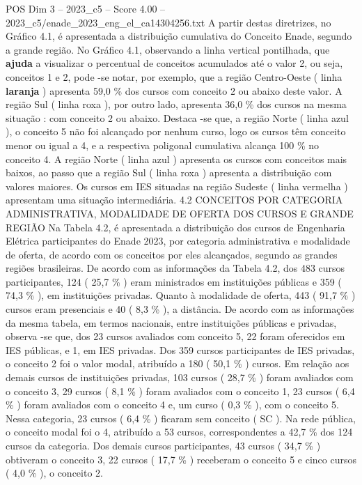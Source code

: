 \begin{textsample}{POS Dim 3 – 2023\_c5 – Score 4.00 – 2023\_c5/enade\_2023\_eng\_el\_ca14304256.txt}
A partir destas diretrizes, no Gráfico 4.1, é apresentada a distribuição cumulativa do Conceito Enade, segundo a grande região.
No Gráfico 4.1, observando a linha vertical pontilhada, que \textbf{ajuda} a visualizar o percentual de conceitos acumulados até o valor 2, ou seja, conceitos 1 e 2, pode -se notar, por exemplo, que a região Centro-Oeste ( linha \textbf{laranja} ) apresenta 59,0 \% dos cursos com conceito 2 ou abaixo deste valor.
A região Sul ( linha roxa ), por outro lado, apresenta 36,0 \% dos cursos na mesma situação : com conceito 2 ou abaixo.
Destaca -se que, a região Norte ( linha azul ), o conceito 5 não foi alcançado por nenhum curso, logo os cursos têm conceito menor ou igual a 4, e a respectiva poligonal cumulativa alcança 100 \% no conceito 4.
A região Norte ( linha azul ) apresenta os cursos com conceitos mais baixos, ao passo que a região Sul ( linha roxa ) apresenta a distribuição com valores maiores.
Os cursos em IES situadas na região Sudeste ( linha vermelha ) apresentam uma situação intermediária. 4.2 CONCEITOS POR CATEGORIA ADMINISTRATIVA, MODALIDADE DE OFERTA DOS CURSOS E GRANDE REGIÃO Na Tabela 4.2, é apresentada a distribuição dos cursos de Engenharia Elétrica participantes do Enade 2023, por categoria administrativa e modalidade de oferta, de acordo com os conceitos por eles alcançados, segundo as grandes regiões brasileiras.
De acordo com as informações da Tabela 4.2, dos 483 cursos participantes, 124 ( 25,7 \% ) eram ministrados em instituições públicas e 359 ( 74,3 \% ), em instituições privadas.
Quanto à modalidade de oferta, 443 ( 91,7 \% ) cursos eram presenciais e 40 ( 8,3 \% ), a distância.
De acordo com as informações da mesma tabela, em termos nacionais, entre instituições públicas e privadas, observa -se que, dos 23 cursos avaliados com conceito 5, 22 foram oferecidos em IES públicas, e 1, em IES privadas.
Dos 359 cursos participantes de IES privadas, o conceito 2 foi o valor modal, atribuído a 180 ( 50,1 \% ) cursos.
Em relação aos demais cursos de instituições privadas, 103 cursos ( 28,7 \% ) foram avaliados com o conceito 3, 29 cursos ( 8,1 \% ) foram avaliados com o conceito 1, 23 cursos ( 6,4 \% ) foram avaliados com o conceito 4 e, um curso ( 0,3 \% ), com o conceito 5.
Nessa categoria, 23 cursos ( 6,4 \% ) ficaram sem conceito ( SC ).
Na rede pública, o conceito modal foi o 4, atribuído a 53 cursos, correspondentes a 42,7 \% dos 124 cursos da categoria.
Dos demais cursos participantes, 43 cursos ( 34,7 \% ) obtiveram o conceito 3, 22 cursos ( 17,7 \% ) receberam o conceito 5 e cinco cursos ( 4,0 \% ), o conceito 2.

\end{textsample}
